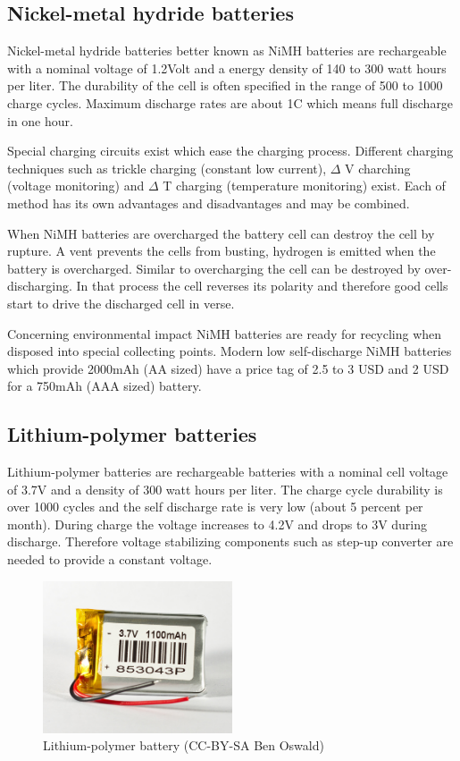 \subsection{Nickel-metal hydride batteries}
Nickel-metal hydride batteries better known as NiMH batteries are rechargeable with a nominal voltage of 1.2Volt and a energy density of 140 to 300 watt hours per liter. The durability of the cell is often specified in the range of 500 to 1000 charge cycles. Maximum discharge rates are about 1C which means full discharge in one hour.

Special charging circuits exist which ease the charging process. Different charging techniques such as trickle charging (constant low current), $\Delta$ V charching (voltage monitoring) and $\Delta$ T charging (temperature monitoring) exist. Each of method has its own advantages and disadvantages and may be combined.

When NiMH batteries are overcharged the battery cell can destroy the cell by rupture. A vent prevents the cells from busting, hydrogen is emitted when the battery is overcharged. Similar to overcharging the cell can be destroyed by over-discharging. In that process the cell reverses its polarity and therefore good cells start to drive the discharged cell in verse.

Concerning environmental impact NiMH batteries are ready for recycling when disposed into special collecting points. Modern low self-discharge NiMH batteries which provide 2000mAh (AA sized) have a price tag of 2.5 to 3 USD and 2 USD for a 750mAh (AAA sized) battery. 
\subsection{Lithium-polymer batteries}
Lithium-polymer batteries are rechargeable batteries with a nominal cell voltage of 3.7V  and a density of 300 watt hours per liter. The charge cycle durability is over 1000 cycles and the self discharge rate is very low (about 5 percent per month). During charge the voltage increases to 4.2V and drops to 3V during discharge. Therefore voltage stabilizing components such as step-up converter are needed to provide a constant voltage.

\begin{figure}[H]
  \centering
  \includegraphics[width=0.5\textwidth]{images/30_lithium-polymer.jpg}
  \caption{Lithium-polymer battery (CC-BY-SA Ben Oswald)}
\end{figure}

